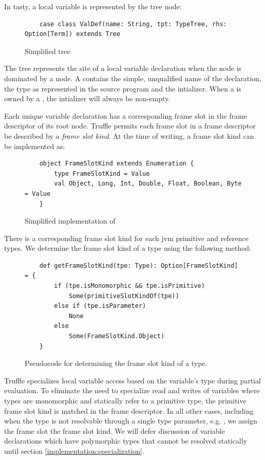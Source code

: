 In \acrshort{tasty}, a local variable is represented by the  tree node:

\begin{figure}[H]
	\begin{verbatim}
	case class ValDef(name: String, tpt: TypeTree, rhs: Option[Term]) extends Tree 
	\end{verbatim}
	\caption{Simplified  tree}
\end{figure}

The  tree represents the site of a local variable declaration when the node is dominated by a  node. 
A  contains the simple, unqualified name of the declaration, the type as represented in the source program and the intializer. 
When a  is owned by a , the intializer will always be non-empty.

Each unique variable declaration has a corresponding frame slot in the frame descriptor of its root node. 
Truffle permits each frame slot in a frame descriptor be described by a \textit{frame slot kind}.
 At the time of writing, a frame slot kind can be implemented as:

\begin{figure}[H]
	\begin{verbatim}
	object FrameSlotKind extends Enumeration {
		type FrameSlotKind = Value
		val Object, Long, Int, Double, Float, Boolean, Byte = Value
	}
	\end{verbatim}
	\caption{Simplified implementation of }
\end{figure}

There is a corresponding frame slot kind for each \acrshort{jvm} primitive and reference types. 
We determine the frame slot kind of a type using the following method:

\begin{figure}[H]
	\begin{verbatim}
	def getFrameSlotKind(tpe: Type): Option[FrameSlotKind] = {
		if (tpe.isMonomorphic && tpe.isPrimitive)
			Some(primitiveSlotKindOf(tpe))
		else if (tpe.isParameter)
			None
		else
			Some(FrameSlotKind.Object)
	}	
	\end{verbatim}
	\caption{Pseudocode for determining the frame slot kind of a type.}
\end{figure}

Truffle specializes local variable access based on the variable's type during partial evaluation\cite{truffle:partial-eval}. 
To eliminate the need to specialize read and writes of variables where types are monomorphic and statically refer to a primitive type, the primitive frame slot kind is matched in the frame descriptor. 
In all other cases, including when the type is not resolvable through a single type parameter, e.g. , we assign the frame slot the  frame slot kind.
We will defer discussion of variable declarations which have polymorphic types that cannot be resolved statically until section \ref{implementation:specialization}.

